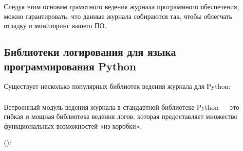 \documentclass[letterpaper,10pt,russian]{sphinxmanual}
\begin{document}
\sphinxAtStartPar
Следуя этим основам грамотного ведения журнала программного обеспечения, можно гарантировать, что данные журнала собираются так, чтобы облегчать отладку и мониторинг вашего ПО.


\subsection{Библиотеки логирования для языка программирования Python}
\label{\detokenize{educational_materials/logging/content:python}}
\sphinxAtStartPar
Существует несколько популярных библиотек ведения журнала для Python:


\subsubsection{}
\label{\detokenize{educational_materials/logging/content:logging}}
\sphinxAtStartPar
Встроенный модуль ведения журнала в стандартной библиотеке Python — это гибкая и мощная библиотека ведения логов, которая предоставляет множество функциональных возможностей «из коробки».

\sphinxAtStartPar
():
\end{document}
